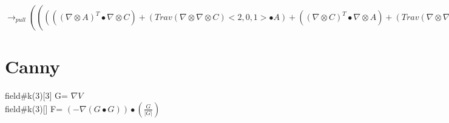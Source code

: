 \documentclass{article}
\begin{document}
\newline $\rightarrow_{pull}((((( \nabla  \otimes A)^T \bullet  \nabla  \otimes C)+(Trav( \nabla  \otimes  \nabla  \otimes C)<2,0,1> \bullet A)+(( \nabla  \otimes C)^T \bullet  \nabla  \otimes A)+(Trav( \nabla  \otimes  \nabla  \otimes A)<2,0,1> \bullet C))* \frac{1}{(|C|*|A|)}+(((C \bullet A)*((A \bullet  \nabla  \otimes A) \otimes (A \bullet  \nabla  \otimes A)))+(2*(C \bullet A)*((A \bullet  \nabla  \otimes A) \otimes (A \bullet  \nabla  \otimes A))))* \frac{1}{(|A|*|C|*((A \bullet A))^2)}+((((C \bullet A)*((A \bullet  \nabla  \otimes A)*(C \bullet  \nabla  \otimes C))))^T+((C \bullet A)*((A \bullet  \nabla  \otimes A) \otimes (C \bullet  \nabla  \otimes C))))* \frac{1}{((C \bullet C)*|A|*|C|*(A \bullet A))}+((C \bullet A)*((C \bullet  \nabla  \otimes C) \otimes (C \bullet  \nabla  \otimes C)))* \frac{1}{(|C|*|A|*((C \bullet C))^2)}+(2*|C|*(C \bullet A)*((C \bullet  \nabla  \otimes C) \otimes (C \bullet  \nabla  \otimes C)))* \frac{1}{(|A|*(C \bullet C)*((C \bullet C))^2)})-(((((((((( \nabla  \otimes C)^T \bullet A) \otimes (A \bullet  \nabla  \otimes A)))+((C \bullet A)*(A \bullet  \nabla  \otimes  \nabla  \otimes A)))+((C \bullet A)*(( \nabla  \otimes A)^T \bullet  \nabla  \otimes A)))+((((( \nabla  \otimes C)^T \bullet A)*(A \bullet  \nabla  \otimes A))))^T)+((((C \bullet  \nabla  \otimes A)*(A \bullet  \nabla  \otimes A))))^T)+(((C \bullet  \nabla  \otimes A) \otimes (A \bullet  \nabla  \otimes A))))* \frac{1}{(|C|*|A|*(A \bullet A))}+(((((((( \nabla  \otimes C)^T \bullet A)*(C \bullet  \nabla  \otimes C))))^T+(((( \nabla  \otimes C)^T \bullet A) \otimes (C \bullet  \nabla  \otimes C))))+((((C \bullet  \nabla  \otimes A)*(C \bullet  \nabla  \otimes C))))^T)+(((( \nabla  \otimes A)^T \bullet C) \otimes (C \bullet  \nabla  \otimes C))))* \frac{1}{(|A|*|C|*(C \bullet C))}+((|C|*(C \bullet A)*(( \nabla  \otimes C)^T \bullet  \nabla  \otimes C))+(|C|*(C \bullet A)*(C \bullet  \nabla  \otimes  \nabla  \otimes C)))* \frac{1}{(|A|*(C \bullet C)*(C \bullet C))}))$

 \newpage
 \section{Canny}
  field\#k(3)[3] G= $\nabla V$\\
 field\#k(3)[] F= $(-\nabla (G \bullet G))\bullet(\frac{G}{|G|})$\\
\end{document}
